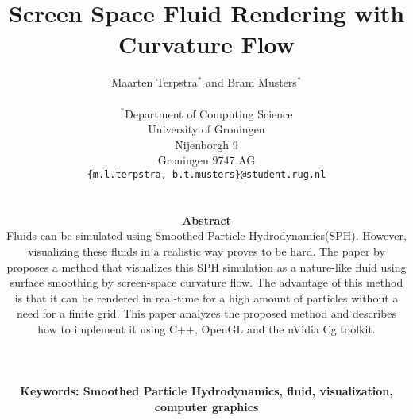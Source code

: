\documentclass[a4paper, 10pt, twocolumn]{eguk2000}
\begin{document}

\title{Screen Space Fluid Rendering with Curvature Flow}
\author{{\sffamily Maarten Terpstra${}^\ast$ and Bram Musters${}^\ast$}\\
\\
${}^\ast$Department of Computing Science\\
University of Groningen\\
Nijenborgh 9\\
Groningen 9747 AG\\
{\tt \{m.l.terpstra, b.t.musters\}@student.rug.nl}\\
\\
\parbox{140truemm}{\normalsize
{\bfseries Abstract}\\
Fluids can be simulated using Smoothed Particle Hydrodynamics(SPH). However, visualizing these fluids in a realistic way proves to be hard.
The paper by \cite{van2009screen} proposes a method that visualizes this SPH simulation as a nature-like fluid using surface smoothing by screen-space curvature flow.
The advantage of this method is that it can be rendered in real-time for a high amount of particles without a need for a finite grid.
This paper analyzes the proposed method and describes how to implement it using C++, OpenGL and the nVidia Cg toolkit.
}
\\
\\
\parbox{140truemm}{\normalsize
{\bfseries Keywords: Smoothed Particle Hydrodynamics, fluid, visualization, computer graphics}
}
} %

\date{}


\maketitle 











\end{document}
